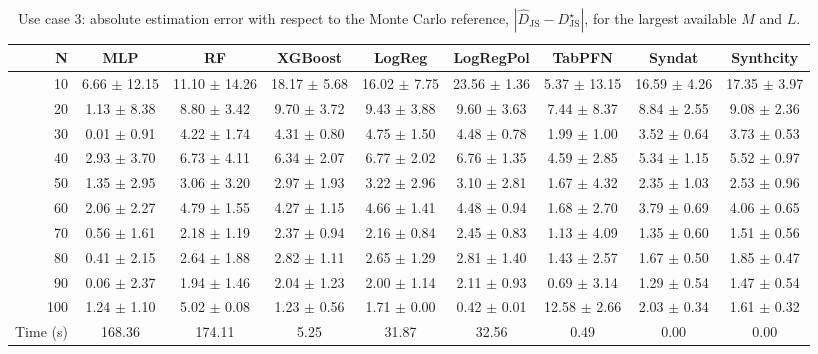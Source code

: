 \begin{table}
\caption{Use case 3: absolute estimation error with respect to the Monte Carlo reference, $|\widehat{D}_{\mathrm{JS}} - D_{\mathrm{JS}}^{\star}|$, for the largest available $M$ and $L$.}
\label{tab:uc3_abs_error_vs_gt}
\begin{tabular}{rcccccccc}
\toprule
N & MLP & RF & XGBoost & LogReg & LogRegPol & TabPFN & Syndat & Synthcity \\
\midrule
10 & 6.66 $\pm$ 12.15 & 11.10 $\pm$ 14.26 & 18.17 $\pm$ 5.68 & 16.02 $\pm$ 7.75 & 23.56 $\pm$ 1.36 & 5.37 $\pm$ 13.15 & 16.59 $\pm$ 4.26 & 17.35 $\pm$ 3.97 \\
20 & 1.13 $\pm$ 8.38 & 8.80 $\pm$ 3.42 & 9.70 $\pm$ 3.72 & 9.43 $\pm$ 3.88 & 9.60 $\pm$ 3.63 & 7.44 $\pm$ 8.37 & 8.84 $\pm$ 2.55 & 9.08 $\pm$ 2.36 \\
30 & 0.01 $\pm$ 0.91 & 4.22 $\pm$ 1.74 & 4.31 $\pm$ 0.80 & 4.75 $\pm$ 1.50 & 4.48 $\pm$ 0.78 & 1.99 $\pm$ 1.00 & 3.52 $\pm$ 0.64 & 3.73 $\pm$ 0.53 \\
40 & 2.93 $\pm$ 3.70 & 6.73 $\pm$ 4.11 & 6.34 $\pm$ 2.07 & 6.77 $\pm$ 2.02 & 6.76 $\pm$ 1.35 & 4.59 $\pm$ 2.85 & 5.34 $\pm$ 1.15 & 5.52 $\pm$ 0.97 \\
50 & 1.35 $\pm$ 2.95 & 3.06 $\pm$ 3.20 & 2.97 $\pm$ 1.93 & 3.22 $\pm$ 2.96 & 3.10 $\pm$ 2.81 & 1.67 $\pm$ 4.32 & 2.35 $\pm$ 1.03 & 2.53 $\pm$ 0.96 \\
60 & 2.06 $\pm$ 2.27 & 4.79 $\pm$ 1.55 & 4.27 $\pm$ 1.15 & 4.66 $\pm$ 1.41 & 4.48 $\pm$ 0.94 & 1.68 $\pm$ 2.70 & 3.79 $\pm$ 0.69 & 4.06 $\pm$ 0.65 \\
70 & 0.56 $\pm$ 1.61 & 2.18 $\pm$ 1.19 & 2.37 $\pm$ 0.94 & 2.16 $\pm$ 0.84 & 2.45 $\pm$ 0.83 & 1.13 $\pm$ 4.09 & 1.35 $\pm$ 0.60 & 1.51 $\pm$ 0.56 \\
80 & 0.41 $\pm$ 2.15 & 2.64 $\pm$ 1.88 & 2.82 $\pm$ 1.11 & 2.65 $\pm$ 1.29 & 2.81 $\pm$ 1.40 & 1.43 $\pm$ 2.57 & 1.67 $\pm$ 0.50 & 1.85 $\pm$ 0.47 \\
90 & 0.06 $\pm$ 2.37 & 1.94 $\pm$ 1.46 & 2.04 $\pm$ 1.23 & 2.00 $\pm$ 1.14 & 2.11 $\pm$ 0.93 & 0.69 $\pm$ 3.14 & 1.29 $\pm$ 0.54 & 1.47 $\pm$ 0.54 \\
100 & 1.24 $\pm$ 1.10 & 5.02 $\pm$ 0.08 & 1.23 $\pm$ 0.56 & 1.71 $\pm$ 0.00 & 0.42 $\pm$ 0.01 & 12.58 $\pm$ 2.66 & 2.03 $\pm$ 0.34 & 1.61 $\pm$ 0.32 \\
Time (s) & 168.36 & 174.11 & 5.25 & 31.87 & 32.56 & 0.49 & 0.00 & 0.00 \\
\bottomrule
\end{tabular}
\end{table}

